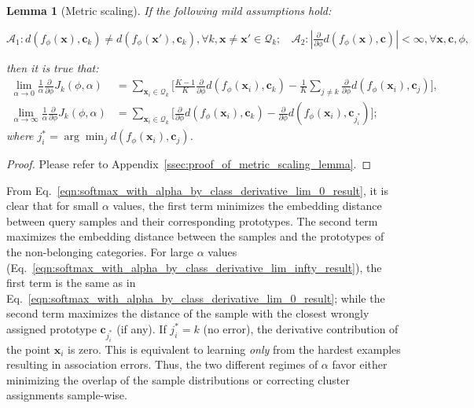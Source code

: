 \documentclass{article}
\renewcommand{\vec}[1]{\mathbf{#1}}
\newcommand{\query}[1]{\mathcal{Q}_{#1}}
\newcommand{\metric}{d}
\newtheorem{lemma}{Lemma}
\begin{document}
\begin{lemma}[Metric scaling] \label{lem:metric_scaling}
If the following mild assumptions hold: 

$\mathcal{A}_1: \metric(f_{\phi}(\vec{x}), \vec{c}_k) \neq \metric(f_{\phi}(\vec{x'}), \vec{c}_k), \forall k, \vec{x} \neq \vec{x'} \in \query{k}; \ \ \ \ \mathcal{A}_2: \left|\frac{\partial}{\partial\phi} \metric(f_{\phi}(\vec{x}), \vec{c}) \right| < \infty, \forall \vec{x}, \vec{c}, \phi,$

then it is true that:
\begin{align} 
    \lim_{\alpha \to 0} \frac{1}{\alpha}\frac{\partial}{\partial\phi}J_k(\phi,\alpha) &= \sum_{\vec{x}_i \in \query{k}} \Big[\frac{K-1}{K} \frac{\partial}{\partial\phi} \metric(f_{\phi}(\vec{x}_{i}), \vec{c}_k)  - \frac{1}{K} \sum_{j \neq k} \frac{\partial}{\partial\phi} \metric(f_{\phi}(\vec{x}_{i}), \vec{c}_j) \Big], \label{eqn:softmax_with_alpha_by_class_derivative_lim_0_result}  \\
    \lim_{\alpha \to \infty} \frac{1}{\alpha}\frac{\partial}{\partial\phi}J_k(\phi,\alpha) &= \sum_{\vec{x}_i \in \query{k}} \Big[ \frac{\partial}{\partial\phi} \metric(f_{\phi}(\vec{x}_{i}), \vec{c}_k)  - \frac{\partial}{\partial\phi} \metric(f_{\phi}(\vec{x}_{i}), \vec{c}_{j_{i}^*}) \Big]; \label{eqn:softmax_with_alpha_by_class_derivative_lim_infty_result} 
\end{align}
where $j_{i}^* = \arg\min_j \metric(f_{\phi}(\vec{x}_i), \vec{c}_j)$. 
\end{lemma}
\begin{proof}
Please refer to Appendix~\ref{ssec:proof_of_metric_scaling_lemma}.
\end{proof}
  
From Eq.~\eqref{eqn:softmax_with_alpha_by_class_derivative_lim_0_result}, it is clear that for small $\alpha$ values, the first term minimizes the embedding distance between query samples and their corresponding prototypes. The second term maximizes the embedding distance between the samples and the prototypes of the non-belonging categories. %
For large $\alpha$ values (Eq.~\eqref{eqn:softmax_with_alpha_by_class_derivative_lim_infty_result}), the first term is the same as in Eq.~\eqref{eqn:softmax_with_alpha_by_class_derivative_lim_0_result}; while the second term maximizes the distance of the sample with the closest wrongly assigned prototype $\mathbf{c}_{j^*_i}$ (if any). If $j^*_i = k$ (no error), the derivative contribution of the point $\vec{x}_{i}$ is zero. This is equivalent to learning \emph{only} from the hardest examples resulting in association errors. %
Thus, the two different regimes of $\alpha$ favor either minimizing the overlap of the sample distributions or correcting cluster assignments sample-wise. 
\end{document}
